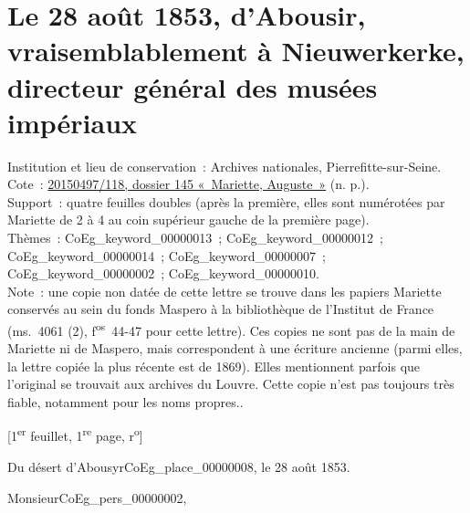 \documentclass{book}
\begin{document}
\section*{Le 28 août 1853, d’Abousir, vraisemblablement à Nieuwerkerke, directeur général des musées impériaux}
{\footnotesize \noindent Institution et lieu de conservation~: Archives nationales, Pierrefitte-sur-Seine.\\
Cote~: \hyperlink{CoEg_Mariette_ms_001}{20150497/118, dossier 145 «~Mariette, Auguste~»} (n. p.).\\
Support~: quatre feuilles doubles (après la première, elles sont numérotées par Mariette de 2 à 4 au coin supérieur gauche de la première page).\\
Thèmes~: \gls{CoEg_keyword_00000013}~; \gls{CoEg_keyword_00000012}~; \gls{CoEg_keyword_00000014}~; \gls{CoEg_keyword_00000007}~;
\gls{CoEg_keyword_00000002}~; \gls{CoEg_keyword_00000010}.\\
Note~: une copie non datée de cette lettre se trouve dans les papiers Mariette conservés au sein du fonds Maspero à la bibliothèque de l’Institut de France (ms.~4061 (2), f\textsuperscript{os}~44-47 pour cette lettre). Ces copies ne sont pas de la main de Mariette ni de Maspero, mais correspondent à une écriture ancienne (parmi elles, la lettre copiée la plus récente est de 1869). Elles mentionnent parfois que l’original se trouvait aux archives du Louvre. Cette copie n’est pas toujours très fiable, notamment pour les noms propres..
\begin{center} {[1\textsuperscript{er} feuillet, 1\textsuperscript{re} page, r\textsuperscript{o}]}\end{center}}
\begin{flushright}Du désert d’Abousyr\gls{CoEg_place_00000008}, le 28 août 1853.\end{flushright}

\hspace{1cm} Monsieur\gls{CoEg_pers_00000002},\\
\end{document}

